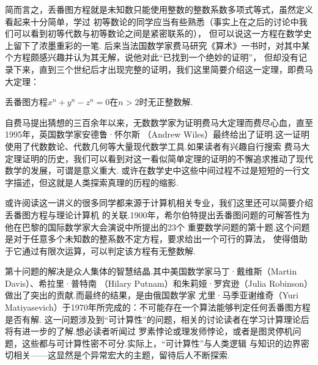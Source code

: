 简而言之，丢番图方程就是未知数只能使用整数的整数系数多项式等式，虽然定义看起来十分简单，学过
初等数论的同学应当有些熟悉（事实上在之后的讨论中我们可以看到初等代数与初等数论之间是紧密联系的），
但可以说这一方程在数学史上留下了浓墨重彩的一笔.
后来当法国数学家费马研究《算术》一书时，对其中某个方程颇感兴趣并认为其无解，说他对此“已找到一个绝妙的证明”，
但却没有记录下来，直到三个世纪后才出现完整的证明，我们这里简要介绍这一定理，即费马大定理：
\begin{theorem}
    丢番图方程$x^n+y^n-z^n=0$在$n>2$时无正整数解.
\end{theorem}

自费马提出猜想的三百余年以来，无数数学家为证明费马大定理而费尽心血，直至1995年，英国数学家安德鲁·怀尔斯
（Andrew Wiles）最终给出了证明.这一证明使用了代数数论、代数几何等大量现代数学工具.如果读者有兴趣自行搜索
费马大定理证明的历史，我们可以看到对这一看似简单定理的证明的不懈追求推动了现代数学的发展，可谓是意义重大.
或许在数学史中这些中间过程不过是短短的一行文字描述，但这就是人类探索真理的历程的缩影.

或许阅读这一讲义的很多同学都来源于计算机相关专业，我们这里还可以简要介绍丢番图方程与理论计算机
的关联.1900年，希尔伯特提出丢番图问题的可解答性为他在巴黎的国际数学家大会演说中所提出的23个
重要数学问题的第十题.这个问题是对于任意多个未知数的整系数不定方程，要求给出一个可行的算法，
使得借助于它通过有限次运算，可以判定该方程有无整数解.

第十问题的解决是众人集体的智慧结晶.其中美国数学家马丁·戴维斯（Martin Davis）、希拉里·普特南
（Hilary Putnam）和朱莉娅·罗宾逊（Julia Robinson）做出了突出的贡献.而最终的结果，是由俄国数学家
尤里·马季亚谢维奇（Yuri Matiyasevich）于1970年所完成的：不可能存在一个算法能够判定任何丢番图方程是否有解.
这一问题涉及到``可计算性''的问题，相关的讨论读者在学习计算理论后将有进一步的了解.想必读者听闻过
罗素悖论或理发师悖论，或者是图灵停机问题，这些都与可计算性密不可分.实际上，``可计算性''与人类逻辑
与知识的边界密切相关——这显然是个异常宏大的主题，留待后人不断探索.

